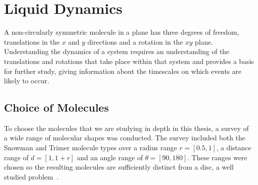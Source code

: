 \chapter{Liquid Dynamics}

A non-circularly symmetric molecule in a plane has three degrees of freedom, translations in the $x$ and $y$ directions and a rotation in the $xy$ plane. Understanding the dynamics of a system requires an understanding of the translations and rotations that take place within that system and provides a basis for further study, giving information about the timescales on which events are likely to occur.

\section{Choice of Molecules}

To choose the molecules that we are studying in depth in this thesis, a survey of a wide range of molecular shapes was conducted. The survey included both the Snowman and Trimer molecule types over a radius range $r = [0.5,1]$, a distance range of $d = [1,1+r]$ and an angle range of $\theta = [90,180]$. These ranges were chosen so the resulting molecules are sufficiently distinct from a disc, a well studied problem~\cite{verlet:67}.

